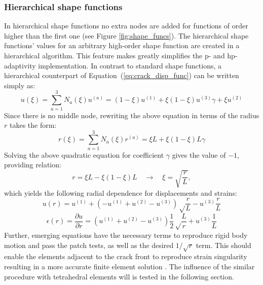 \documentclass[11pt]{ACMEarticle}
\numberwithin{equation}{section}
\begin{document}
\subsubsection{Hierarchical shape functions}
In hierarchical shape functions \citep{Ainsworth2003} no extra nodes are added for functions of order higher than the first one (see Figure \ref{fig:shape_funcs}). The hierarchical shape functions' values for an arbitrary high-order shape function are created in a hierarchical algorithm. This feature makes greatly simplifies the p- and hp- adaptivity implementation. In contrast to standard shape functions, a hierarchical counterpart of Equation~(\ref{eq:crack_disp_func}) can be written simply as:
\begin{equation}
u(\xi) = \sum_{a=1}^3 N_a (\xi) u^{(a)} = (1 -\xi)u^{(1)} + \xi(1 - \xi)u^{(3)}\gamma + \xi u^{(2)}
\end{equation}
Since there is no middle node, rewriting the above equation in terms of the radius $r$ takes the form:
\begin{equation}
r(\xi) = \sum_{a=1}^3 N_a (\xi) r^{(a)} = \xi L + \xi(1-\xi)  L  \gamma
\end{equation}
Solving the above quadratic equation for coefficient $\gamma$ gives the value of $-1$, providing relation:
\begin{equation}
r= \xi L - \xi(1-\xi)L \quad \rightarrow \quad \xi = \sqrt{\frac{r}{L}},
\end{equation}
which yields the following radial dependence for displacements and strains:
\begin{equation*}
u(r) = u^{(1)} + \left( -u^{(1)} + u^{(2)} - u^{(3)} \right) \sqrt \frac{r}{L} - u^{(3)} \frac{r}{L}
\end{equation*}
\begin{equation}
\epsilon(r) = \frac{\partial u}{\partial r} = \left( u^{(1)}  + u^{(2)} - u^{(3)}  \right) \frac{1}{2} \sqrt \frac{L}{r} + u^{(3)} \frac{1}{L}
\end{equation}
Further, emerging equations have the necessary terms to reproduce rigid body motion and pass the patch tests, as well as the desired $1 / \sqrt r$ term.
This should enable the elements adjacent to the crack front to reproduce strain singularity resulting in a more accurate finite element solution \citep{nejati2015use}. The influence of the similar procedure with tetrahedral elements will is tested in the following section.
\end{document}
